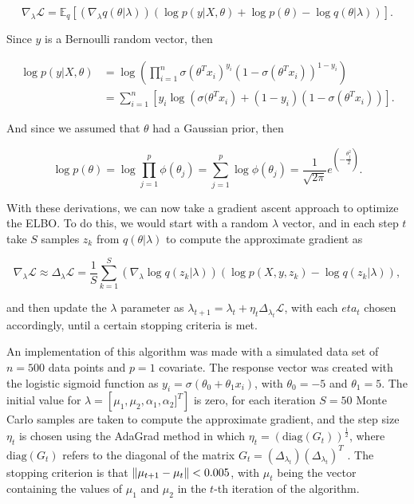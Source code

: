 $$
  \nabla_{\lambda} \mathcal{L} = \mathbb{E}_q \left[ \left( \nabla_{\lambda} q(\theta | \lambda) \right) \left( \log p(y | X, \theta) + \log p(\theta) - \log q(\theta | \lambda) \right) \right].
$$

Since $y$ is a Bernoulli random vector, then


\begin{equation*}
  \begin{split}
      \log p(y | X, \theta) &=
      \log \left( \prod_{i = 1}^n \sigma(\theta^T x_i)^{y_i} (1 - \sigma(\theta^T x_i))^{1-y_i} \right) \\
      &= \sum_{i = 1}^n \left[ y_i \log \left( \sigma(\theta^T x_i \right) + (1 - y_i) (1 - \sigma(\theta^T x_i)) \right].
  \end{split}
\end{equation*}

And since we assumed that $\theta$ had a Gaussian prior, then

$$
  \log p(\theta) = \log \prod_{j = 1}^p \phi(\theta_j) = \sum_{j = 1}^p \log \phi(\theta_j) = \frac{1}{\sqrt{2 \pi}} e^{\left( -\frac{\theta_j^2}{2} \right)}.
$$

With these derivations, we can now take a gradient ascent approach to optimize the ELBO. To do this, we would start with a random $\lambda$ vector, and in each step $t$ take $S$ samples $z_k$ from $q(\theta | \lambda)$ to compute the approximate gradient as

$$
  \nabla_{\lambda} \mathcal{L} \approx \Delta_{\lambda} \mathcal{L} = \frac{1}{S} \sum_{k = 1}^S \left( \nabla_{\lambda} \log q(z_k | \lambda) \right) \left( \log p(X, y, z_k) - \log q(z_k | \lambda) \right),
$$

and then update the $\lambda$ parameter as $\lambda_{t+1} = \lambda_{t} + \eta_t  \Delta_{\lambda_t} \mathcal{L}$, with each $eta_t$ chosen accordingly, until a certain stopping criteria is met.

An implementation of this algorithm was made with a simulated data set of $n = 500$ data points and $p = 1$ covariate. The response vector was created with the logistic sigmoid function as $y_i = \sigma(\theta_0 + \theta_1 x_i)$, with $\theta_0 = -5$ and $\theta_1 = 5$. The initial value for $\lambda = \left[ \mu_1, \mu_2, \alpha_1, \alpha_2 ]^T \right]$ is zero, for each iteration $S = 50$ Monte Carlo samples are taken to compute the approximate gradient, and the step size $\eta_t$ is chosen using the AdaGrad method in which
$\eta_t = \left( \mathrm{diag}(G_t) \right)^{\frac{1}{2}}$, where $\mathrm{diag}(G_t)$ refers to the diagonal of the matrix $G_t = \left( \Delta_{\lambda_t} \right) \left( \Delta_{\lambda_t} \right)^T$ \cite{duchi2011adaptive}. The stopping criterion is that
$\left\lVert \mu_{t+1} - \mu_{t} \right\rVert < 0.005$,
with $\mu_t$ being the vector containing the values of $\mu_1$ and $\mu_2$ in the $t$-th iteration of the algorithm.


